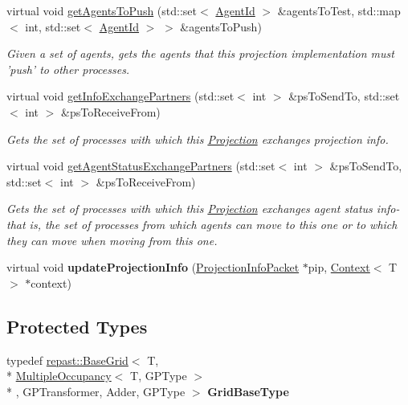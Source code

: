 \begin{DoxyCompactItemize}
\item 
virtual void \hyperlink{classrepast_1_1_shared_base_grid_ab1486e7698288efc1218653d4e5e1e15}{get\-Agents\-To\-Push} (std\-::set$<$ \hyperlink{classrepast_1_1_agent_id}{Agent\-Id} $>$ \&agents\-To\-Test, std\-::map$<$ int, std\-::set$<$ \hyperlink{classrepast_1_1_agent_id}{Agent\-Id} $>$ $>$ \&agents\-To\-Push)
\begin{DoxyCompactList}\small\item\em Given a set of agents, gets the agents that this projection implementation must 'push' to other processes. \end{DoxyCompactList}\item 
virtual void \hyperlink{classrepast_1_1_shared_base_grid_af4323686714c4f6216125db5609c3184}{get\-Info\-Exchange\-Partners} (std\-::set$<$ int $>$ \&ps\-To\-Send\-To, std\-::set$<$ int $>$ \&ps\-To\-Receive\-From)
\begin{DoxyCompactList}\small\item\em Gets the set of processes with which this \hyperlink{classrepast_1_1_projection}{Projection} exchanges projection info. \end{DoxyCompactList}\item 
virtual void \hyperlink{classrepast_1_1_shared_base_grid_a0388d98240eb59548058d3c45da702d7}{get\-Agent\-Status\-Exchange\-Partners} (std\-::set$<$ int $>$ \&ps\-To\-Send\-To, std\-::set$<$ int $>$ \&ps\-To\-Receive\-From)
\begin{DoxyCompactList}\small\item\em Gets the set of processes with which this \hyperlink{classrepast_1_1_projection}{Projection} exchanges agent status info-\/ that is, the set of processes from which agents can move to this one or to which they can move when moving from this one. \end{DoxyCompactList}\item 
\hypertarget{classrepast_1_1_shared_base_grid_abe043188d6e0f7dd350aed6d78c4b98e}{virtual void {\bfseries update\-Projection\-Info} (\hyperlink{classrepast_1_1_projection_info_packet}{Projection\-Info\-Packet} $\ast$pip, \hyperlink{classrepast_1_1_context}{Context}$<$ T $>$ $\ast$context)}\label{classrepast_1_1_shared_base_grid_abe043188d6e0f7dd350aed6d78c4b98e}

\end{DoxyCompactItemize}
\subsection*{Protected Types}
\begin{DoxyCompactItemize}
\item 
\hypertarget{classrepast_1_1_shared_base_grid_afdd62d17e80eb799ba63451b8f78f0ee}{typedef \hyperlink{classrepast_1_1_base_grid}{repast\-::\-Base\-Grid}$<$ T, \\*
\hyperlink{classrepast_1_1_multiple_occupancy}{Multiple\-Occupancy}$<$ T, G\-P\-Type $>$\\*
, G\-P\-Transformer, Adder, G\-P\-Type $>$ {\bfseries Grid\-Base\-Type}}\label{classrepast_1_1_shared_base_grid_afdd62d17e80eb799ba63451b8f78f0ee}

\end{DoxyCompactItemize}
